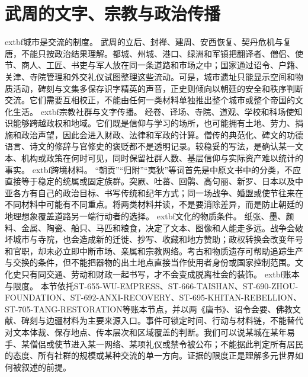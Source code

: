 \section{武周的文字、宗教与政治传播} \label{sec:wu-zhou-literary-religious-politics}  \noindent	extbf{城市是交流的制度。} 武周的立后、封禅、建周、安西恢复、契丹危机与复唐，不能只按政治结果理解。都城、州城、港口、绿洲和军镇把翻译者、僧侣、使节、商人、工匠、书吏与军人放在同一条道路和市场之中；国家通过诏令、户籍、关津、寺院管理和外交礼仪试图整理这些流动。可是，城市遗址只能显示空间和物质活动，碑刻与文集多保存识字精英的声音，正史则倾向以朝廷的安全和秩序判断交流。它们需要互相校正，不能由任何一类材料单独推出整个城市或整个帝国的文化生活。  \noindent	extbf{宗教社群与文字传播。} 经卷、译场、寺院、道观、学校和科场使知识能够跨越政权和地域。它们既是信仰与学习的场所，也可能拥有土地、劳力、捐施和政治声望，因此会进入财政、法律和军政的计算。僧传的典范化、碑文的功德语言、诗文的修辞与官修史的褒贬都不是透明记录。较稳妥的写法，是确认某一文本、机构或政策在何时可见，同时保留社群人数、基层信仰与实际资产难以统计的事实。  \noindent	extbf{跨境材料。} “朝贡”“归附”“夷狄”等词首先是中原文书中的分类，不应直接等于稳定的统属或固定族群。突厥、吐蕃、回鹘、高句丽、新罗、日本以及中亚各方有自己的政治目标、书写传统和纪年方式；同一场战争、婚盟或使节往来在不同材料中可能有不同重点。将两类材料并读，不是要消除差异，而是防止朝廷的地理想象覆盖道路另一端行动者的选择。  \noindent	extbf{文化的物质条件。} 纸张、墨、颜料、金属、陶瓷、船只、马匹和粮食，决定了文本、图像和人能走多远。战争会破坏城市与寺院，也会造成新的迁徙、抄写、收藏和地方赞助；政权转换会改变年号和官职，却未必立即中断市场、亲属和宗教网络。考古和物质遗存可帮助追踪生产与交换的条件，但不能把器物的出土地点直接当作使用者身份或国家控制范围。文化史只有同交通、劳动和财政一起书写，才不会变成脱离社会的装饰。  \noindent	extbf{账本与限度。} 本节依托ST-655-WU-EMPRESS、ST-666-TAISHAN、ST-690-ZHOU-FOUNDATION、ST-692-ANXI-RECOVERY、ST-695-KHITAN-REBELLION、ST-705-TANG-RESTORATION等账本节点，并以两《唐书》、诏令会要、佛教文献、碑刻与边疆材料为主要来源入口。事件可锁定时间、行动与材料链，不能替代对文本体裁、保存地点、传本层次和区域覆盖的判断。我们可以说某城在某年易手、某僧侣或使节进入某一网络、某项礼仪或禁令被公布；不能据此判定所有居民的态度、所有社群的规模或某种交流的单一方向。证据的限度正是理解多元世界如何被叙述的前提。  